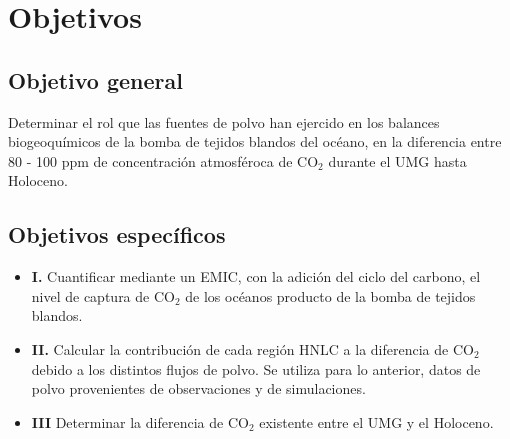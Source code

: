 \section{Objetivos}

\subsection{Objetivo general}

Determinar el rol que las fuentes de polvo han ejercido en los balances biogeoquímicos de la bomba de tejidos blandos del océano, en la diferencia entre 80 - 100 ppm de concentración atmosféroca de CO$_2$ durante el UMG hasta Holoceno. 


\subsection{Objetivos espec\'ificos}

\begin{itemize}
  \item{\bf I.} Cuantificar mediante un EMIC, con la adición del ciclo del carbono, el nivel de captura de CO$_2$ de los océanos producto de la bomba de tejidos blandos. 
  \item{\bf II.} Calcular la contribución de cada región HNLC a la diferencia de CO$_2$ debido a los distintos flujos de polvo. Se utiliza para lo anterior, datos de polvo provenientes de observaciones y de simulaciones.
 \item{\bf III} Determinar la diferencia de CO$_2$ existente entre el UMG y el Holoceno. 
  \end{itemize}


